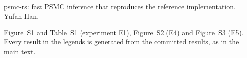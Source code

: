 \documentclass[11pt]{article}
\begin{document}
\\[2pt]
\noindent psmc-rs: fast PSMC inference that reproduces the reference implementation. Yufan Han.\par\medskip
\noindent Figure~S1 and Table~S1 (experiment E1), Figure~S2 (E4) and Figure~S3 (E5). Every result in the legends is generated from the committed results, as in the main text.\par\medskip

\newcommand{\suppmethods}{Validation, in the main text}

\end{document}
